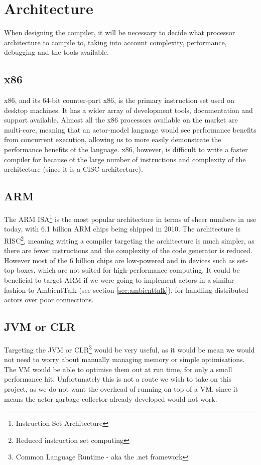 \documentclass[11pt,a4paper]{report}
\begin{document}
\newpage
\section{Architecture}

When designing the compiler, it will be necessary to decide what processor architecture to compile to, taking into account complexity, performance, debugging and the tools available.

\subsection{x86}

x86, and its 64-bit counter-part x86, is the primary instruction set used on desktop machines. It has a wider array of development tools, documentation and support available.
Almost all the x86 processors available on the market are multi-core, meaning that an actor-model language would see performance benefits from concurrent execution, allowing us to more easily demonstrate the performance benefits of the language.
x86, however, is difficult to write a faster compiler for because of the large number of instructions and complexity of the architecture (since it is a CISC architecture).

\subsection{ARM}

The ARM ISA\footnote{Instruction Set Architecture} is the most popular architecture in terms of sheer numbers in use today, with 6.1 billion ARM chips being shipped in 2010\cite{theregister2011}.
The architecture is RISC\footnote{Reduced instruction set computing}, meaning writing a compiler targeting the architecture is much simpler, as there are fewer instructions and the complexity of the code generator is reduced.
However most of the 6 billion chips are low-powered and in devices such as set-top boxes, which are not suited for high-performance computing. It could be beneficial to target ARM if we were going to implement actors in a similar fashion to AmbientTalk (see section \ref{sec:ambienttalk}), for handling distributed actors over poor connections.

\subsection{JVM or CLR}

Targeting the JVM or CLR\footnote{Common Language Runtime - aka the .net framework} would be very useful, as it would be mean we would not need to worry about manually managing memory or simple optimisations. 
The VM would be able to optimise them out at run time, for only a small performance hit.
Unfortunately this is not a route we wish to take on this project, as we do not want the overhead of running on top of a VM, since it means the actor garbage collector already developed would not work.
\end{document}
